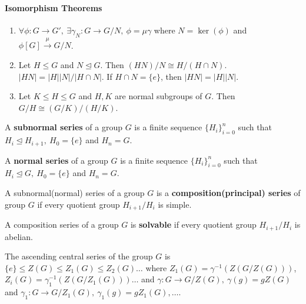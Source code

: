 \paragraph{Isomorphism Theorems}
\begin{enumerate}
	\item $\forall \phi : G \to G',\ \exists \gamma_N : G \to G/N,\ \phi = \mu \gamma$ where $N = \ker(\phi)$ and $\phi[G] \overset{\mu}{\to} G/N$.
	\item Let $H \le G$ and $N \trianglelefteq G$. Then $(HN)/N \cong H/(H \cap N)$.
		\subitem $|HN| = |H| |N| / |H \cap N|$.
		\subitem If $H \cap N = \{ e \}$, then $|HN| = |H| |N|$.
	\item Let $K \le H \le G$ and $H,K$ are normal subgroups of $G$. Then $G/H \cong (G/K)/(H/K)$.
\end{enumerate}

\begin{definition}
	A \textbf{subnormal series} of a group $G$ is a finite sequence $\{ H_i \}_{i=0}^n$ such that $H_i \trianglelefteq H_{i+1},\ H_0 = \{ e \}$ and $H_n = G$.
\end{definition}

\begin{definition}
	A \textbf{normal series} of a group $G$ is a finite sequence $\{ H_i \}_{i=0}^n$ such that $H_i \trianglelefteq G,\ H_0 = \{ e \}$ and $H_n = G$.
\end{definition}

\begin{definition}
	A subnormal(normal) series of a group $G$ is a \textbf{composition(principal) series} of group $G$ if every quotient group $H_{i+1}/H_i$ is simple.
\end{definition}

\begin{definition}
	A composition series of a group $G$ is \textbf{solvable} if every quotient group $H_{i+1}/H_i$ is abelian.
\end{definition}

\begin{definition}
	The ascending central series of the group $G$ is $\{ e \} \le Z(G) \le Z_1(G) \le Z_2(G) \dots$ where $Z_1(G) = \gamma^{-1}(Z(G/Z(G)))$, $Z_i(G) = \gamma_1^{-1}(Z(G/Z_1(G))) \dots$ and $\gamma : G \to G/Z(G),\ \gamma(g) = gZ(G)$ and $\gamma_1 : G \to G/Z_1(G),\ \gamma_1(g) = gZ_1(G),\dots$.
\end{definition}

